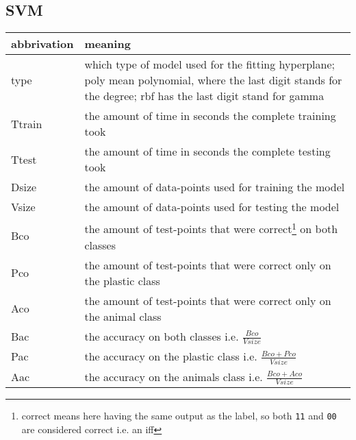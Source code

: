\begin{appendix}
{\subsection{SVM}
\ifx\showapp\undefined
\begin{tabular}{ p{ } | p{ } }
abbrivation & meaning \\ \hline
type & which type of model used for the fitting hyperplane; poly mean polynomial, where the last digit stands for the degree; rbf has the last digit stand for gamma \\
Ttrain & the amount of time in seconds the complete training took \\
Ttest & the amount of time in seconds the complete testing took \\
Dsize & the amount of data-points used for training the model \\
Vsize & the amount of data-points used for testing the model \\
Bco & the amount of test-points that were correct\footnote{correct means here having the same output as the label, so both \texttt{11} and \texttt{00} are considered correct i.e. an iff} on both classes \\
Pco & the amount of test-points that were correct only on the plastic class \\
Aco & the amount of test-points that were correct only on the animal class \\
Bac & the accuracy on both classes i.e. $\frac{Bco}{Vsize}$ \\
Pac & the accuracy on the plastic class i.e. $\frac{Bco+Pco}{Vsize}$ \\
Aac & the accuracy on the animals class i.e. $\frac{Bco+Aco}{Vsize}$
\end{tabular}

\fi

}\end{appendix}
